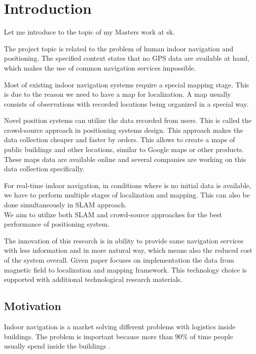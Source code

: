 \chapter{Introduction}

Let me introduce to the topic of my Masters work at \acrfull{sk}.



The project topic is related to the problem of human indoor navigation and positioning. 
The specified context states that no GPS data are available at hand, which makes the use of common navigation services impossible.

Most of existing indoor navigation systems require a special mapping stage. This is due to the reason we need to have a map for localization. A map usually consists of observations with recorded locations being organized in a special way.

Novel position systems can utilize the data recorded from users. This is called the crowd-source approach in positioning systems design. This approach makes the data collection cheaper and faster by orders. This allows to create a maps of public buildings and other locations, similar to Google maps or other products. These maps data are available online and several companies are working on this data collection specifically.

For real-time indoor navigation, in conditions where is no initial data is available, we have to perform multiple stages of localization and mapping. This can also be done simultaneously in SLAM approach. \\
We aim to utilize both SLAM and crowd-source approaches for the best performance of positioning system.

The innovation of this research is in ability to provide same navigation services with less information and in more natural way, which means also the reduced cost of the system overall.
Given paper focuses on implementation the data from magnetic field to localization and mapping framework. This technology choice is supported with additional technological research materials.

\section*{Motivation}

Indoor navigation is a market solving different problems with logistics inside buildings. The problem is important because more than $90 \%$ of time people usually spend inside the buildings \cite{IndoorGeneration}.

